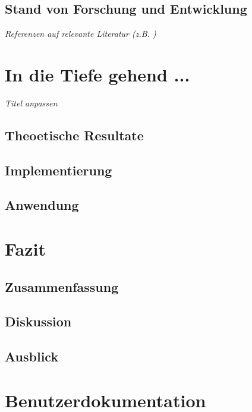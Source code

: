 \documentclass{article}
\begin{document}
\subsection{Stand von Forschung und Entwicklung}
\label{sec:2.2}

{\em Referenzen auf relevante Literatur (z.B. \cite{Ries1522Rad})}

\section{In die Tiefe gehend ...}
\label{ch:3}

{\em Titel anpassen}

\subsection{Theoetische Resultate}
\label{sec:3.1}

\subsection{Implementierung}
\label{sec:3.2}

\subsection{Anwendung}
\label{sec:3.3}

\section{Fazit}
\label{ch:4}

\subsection{Zusammenfassung}
\label{sec:4.1}

\subsection{Diskussion}
\label{sec:4.2}

\subsection{Ausblick}
\label{sec:4.3}

\nocite{}



\newpage
\appendix

\section{Benutzerdokumentation}
\label{app1}
\end{document}
